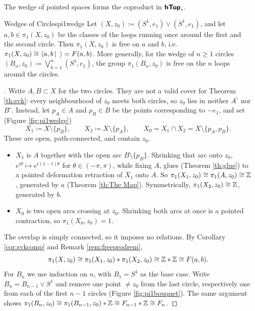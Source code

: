 The wedge of pointed spaces forms the coproduct in $\bm{\mathsf{hTop}}_*$.

\begin{example}{Wedges of Circles}{pi1wedge}
  Let $(X,z_0)\coloneq(S^1,e_1)\lor(S^1,e_1)$, and let $a,b\in\pi_1(X,z_0)$ be the classes of the loops running once around the first and the second circle. Then $\pi_1(X,z_0)$ is free on $a$ and $b$, i.e.\ $\pi_1(X,z_0)\iso\pres{a,b}{\ }=F(a,b)$. More generally, for the wedge of $n\geq1$ circles $(B_n,z_0)\coloneq\bigvee_{k=1}^n(S^1,e_1)$, the group $\pi_1(B_n,z_0)$ is free on the $n$ loops around the circles.
\end{example}

\begin{proof}[]
  Write $A,B\subset X$ for the two circles. They are not a valid cover for Theorem \ref{th:svk}: every neighbourhood of $z_0$ meets both circles, so $z_0$ lies in neither $A^\circ$ nor $B^\circ$. Instead, let $p_A\in A$ and $p_B\in B$ be the points corresponding to $-e_1$, and set (Figure \ref{fig:pi1wedge}) \[
    X_1\coloneq X\setminus\{p_B\},\qquad X_2\coloneq X\setminus\{p_A\},\qquad X_0=X_1\cap X_2=X\setminus\{p_A,p_B\}.
  \]
  These are open, path-connected, and contain $z_0$.
  \begin{itemize}
    \item $X_1$ is $A$ together with the open arc $B\setminus\{p_B\}$. Shrinking that arc onto $z_0$, $e^{i\theta}\mapsto e^{i(1-t)\theta}$ for $\theta\in(-\pi,\pi)$, while fixing $A$, glues (Theorem \ref{th:glue}) to a pointed deformation retraction of $X_1$ onto $A$. So $\pi_1(X_1,z_0)\cong\pi_1(A,z_0)\cong\mathbb{Z}$, generated by $a$ (Theorem \ref{th:The Map}). Symmetrically, $\pi_1(X_2,z_0)\cong\mathbb{Z}$, generated by $b$.
    \item $X_0$ is two open arcs crossing at $z_0$. Shrinking both arcs at once is a pointed contraction, so $\pi_1(X_0,z_0)=1$.
  \end{itemize}
  The overlap is simply connected, so it imposes no relations. By Corollary \ref{cor:svkcomp} and Remark \ref{rem:freeprodrem}, \[
    \pi_1(X,z_0)\cong\pi_1(X_1,z_0)\ast\pi_1(X_2,z_0)\cong\mathbb{Z}\ast\mathbb{Z}\cong F(a,b).
  \]
  For $B_n$ we use induction on $n$, with $B_1=S^1$ as the base case. Write $B_n=B_{n-1}\lor S^1$ and remove one point $\neq z_0$ from the last circle, respectively one from each of the first $n-1$ circles (Figure \ref{fig:pi1bouquet}). The same argument shows $\pi_1(B_n,z_0)\cong\pi_1(B_{n-1},z_0)\ast\mathbb{Z}\cong F_{n-1}\ast\mathbb{Z}\cong F_n$.
\end{proof}

